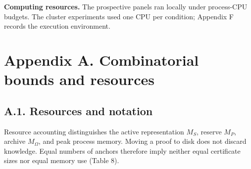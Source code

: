 \documentclass[pdflatex,sn-basic,Numbered]{sn-jnl}
\begin{document}
\textbf{Computing resources.} The prospective panels ran locally under process-CPU budgets. The cluster experiments used one CPU per condition; Appendix F records the execution environment.

\section*{Appendix A. Combinatorial bounds and resources}\label{appendix-a.-combinatorial-bounds-and-resources}

\subsection*{A.1. Resources and notation}\label{a.1.-resources-and-notation}

Resource accounting distinguishes the active representation \(M_{S}\), reserve \(M_{P}\), archive \(M_{\Omega}\), and peak process memory. Moving a proof to disk does not discard knowledge. Equal numbers of anchors therefore imply neither equal certificate sizes nor equal memory use (Table 8).

\begingroup
\small
\setlength{\tabcolsep}{3pt}
\renewcommand{\arraystretch}{1.13}
\end{document}
